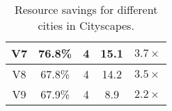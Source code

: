 \begin{table}[t]
\begin{tabular}{|c|c|c|c|c|}
V7                                                                      & 76.8\%                    & 4           & 15.1                 & $3.7\times$                                                                 \\ \hline
V8                                                                      & 67.8\%                    & 4           & 14.2                 & $3.5\times$                                                                 \\ \hline
V9                                                                      & 67.9\%                    & 4           & 8.9                  & $2.2\times$                                                                \\ \hline
\end{tabular}
\caption{Resource savings for different cities in Cityscapes.}
\label{tab:resource-savings-final}
\end{table}